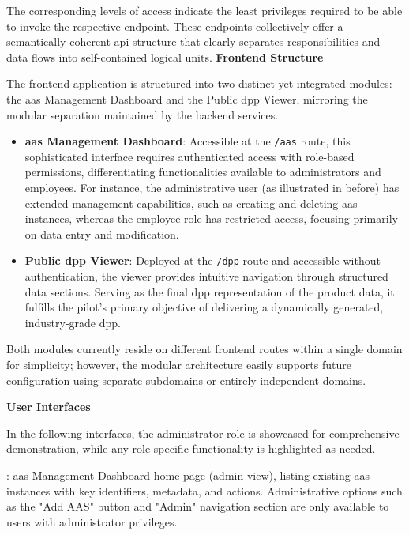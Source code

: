 The corresponding levels of access indicate the least privileges required to be able to invoke the respective endpoint. These endpoints collectively offer a semantically coherent \ac{api} structure that clearly separates responsibilities and data flows into self-contained logical units. 
\textbf{Frontend Structure}

The frontend application is structured into two distinct yet integrated modules: the \ac{aas} Management Dashboard and the Public \ac{dpp} Viewer, mirroring the modular separation maintained by the backend services.

\begin{itemize}[itemsep=0.5\baselineskip]
    \item \textbf{\ac{aas} Management Dashboard}: Accessible at the \verb|/aas| route, this sophisticated interface requires authenticated access with role-based permissions, differentiating functionalities available to administrators and employees. For instance, the administrative user (as illustrated in  before) has extended management capabilities, such as creating and deleting \ac{aas} instances, whereas the employee role has restricted access, focusing primarily on data entry and modification.

    \item \textbf{Public \ac{dpp} Viewer}: Deployed at the \verb|/dpp| route and accessible without authentication, the viewer provides intuitive navigation through structured data sections. Serving as the final \ac{dpp} representation of the product data, it fulfills the pilot’s primary objective of delivering a dynamically generated, industry-grade \acrlong{dpp}.
\end{itemize}

Both modules currently reside on different frontend routes within a single domain for simplicity; however, the modular architecture easily supports future configuration using separate subdomains or entirely independent domains.

\textbf{User Interfaces}

In the following interfaces, the administrator role is showcased for comprehensive demonstration, while any role-specific functionality is highlighted as needed.

: \ac{aas} Management Dashboard home page (admin view), listing existing \ac{aas} instances with key identifiers, metadata, and actions. Administrative options such as the "Add AAS" button and "Admin" navigation section are only available to users with administrator privileges.

